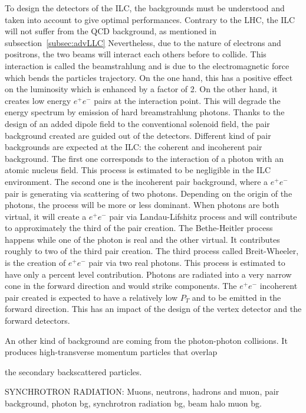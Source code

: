     To design the detectors of the \gls{ILC}, the backgrounds must be understood and taken into account to give optimal performances.
    Contrary to the \gls{LHC}, the \gls{ILC} will not suffer from the QCD background, as mentioned in subsection~\ref{subsec:advLLC}
    Nevertheless, due to the nature of electrons and positrons, the two beams will interact each others before to collide.
    This interaction is called the beamstrahlung and is due to the electromagnetic force which bends the particles trajectory.
    On the one hand, this has a positive effect on the luminosity which is enhanced by a factor of 2.
    On the other hand, it creates low energy $e^+e^-$ pairs at the interaction point. 
    This will degrade the energy spectrum by emission of hard breamstrahlung photons.
    Thanks to the design of an added dipole field to the conventional solenoid field, the pair background created are guided out of the detectors. 
    Different kind of pair backgrounds are expected at the \gls{ILC}: the coherent and incoherent pair background.
    The first one corresponds to the interaction of a photon with an atomic nucleus field.
    This process is estimated to be negligible in the \gls{ILC} environment.
    The second one is the incoherent pair background, where a $e^+e^-$ pair is generating via scattering of two photons.
    Depending on the origin of the photons, the process will be more or less dominant.
    When photons are both virtual, it will create a $e^+e^-$ pair via Landau-Lifshitz process and will contribute to approximately the third of the pair creation.
    The Bethe-Heitler process happens while one of the photon is real and the other virtual. 
    It contributes roughly to two of the third pair creation.
    The third process called Breit-Wheeler, is the creation of $e^+e^-$ pair via two real photons.
    This process is estimated to have only a percent level contribution.
    Photons are radiated into a very narrow cone in the forward direction and would strike components.
    The $e^+e^-$ incoherent pair created is expected to have a relatively low $P_T$ and to be emitted in the forward direction.
    This has an impact of the design of the vertex detector and the forward detectors.
    

    An other kind of background are coming from the photon-photon collisions.
    It produces high-transverse momentum particles that overlap 
    
    
    the secondary backscattered particles.

    SYNCHROTRON RADIATION: Muons, neutrons, hadrons and muon, pair background, photon bg, synchrotron radiation bg, beam halo muon bg.


